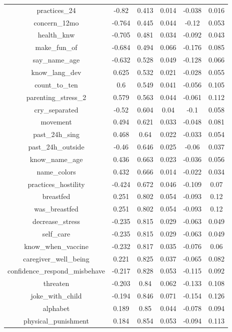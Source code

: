 \begin{table}[!htbp]
\begin{tabular}{@{\extracolsep{5pt}} cccccc}
practices\_24 & -0.82 & 0.413 & 0.014 & -0.038 & 0.016 \\ 
concern\_12mo & -0.764 & 0.445 & 0.044 & -0.12 & 0.053 \\ 
health\_knw & -0.705 & 0.481 & 0.034 & -0.092 & 0.043 \\ 
make\_fun\_of & -0.684 & 0.494 & 0.066 & -0.176 & 0.085 \\ 
say\_name\_age & -0.632 & 0.528 & 0.049 & -0.128 & 0.066 \\ 
know\_lang\_dev & 0.625 & 0.532 & 0.021 & -0.028 & 0.055 \\ 
count\_to\_ten & 0.6 & 0.549 & 0.041 & -0.056 & 0.105 \\ 
parenting\_stress\_2 & 0.579 & 0.563 & 0.044 & -0.061 & 0.112 \\ 
cry\_separated & -0.52 & 0.604 & 0.04 & -0.1 & 0.058 \\ 
movement & 0.494 & 0.621 & 0.033 & -0.048 & 0.081 \\ 
past\_24h\_sing & 0.468 & 0.64 & 0.022 & -0.033 & 0.054 \\ 
past\_24h\_outside & -0.46 & 0.646 & 0.025 & -0.06 & 0.037 \\ 
know\_name\_age & 0.436 & 0.663 & 0.023 & -0.036 & 0.056 \\ 
name\_colors & 0.432 & 0.666 & 0.014 & -0.022 & 0.034 \\ 
practices\_hostility & -0.424 & 0.672 & 0.046 & -0.109 & 0.07 \\ 
breastfed & 0.251 & 0.802 & 0.054 & -0.093 & 0.12 \\ 
was\_breastfed & 0.251 & 0.802 & 0.054 & -0.093 & 0.12 \\ 
decrease\_stress & -0.235 & 0.815 & 0.029 & -0.063 & 0.049 \\ 
self\_care & -0.235 & 0.815 & 0.029 & -0.063 & 0.049 \\ 
know\_when\_vaccine & -0.232 & 0.817 & 0.035 & -0.076 & 0.06 \\ 
caregiver\_well\_being & 0.221 & 0.825 & 0.037 & -0.065 & 0.082 \\ 
confidence\_respond\_misbehave & -0.217 & 0.828 & 0.053 & -0.115 & 0.092 \\ 
threaten & -0.203 & 0.84 & 0.062 & -0.133 & 0.108 \\ 
joke\_with\_child & -0.194 & 0.846 & 0.071 & -0.154 & 0.126 \\ 
alphabet & 0.189 & 0.85 & 0.044 & -0.078 & 0.094 \\ 
physical\_punishment & 0.184 & 0.854 & 0.053 & -0.094 & 0.113 \\ 

\end{tabular}
\end{table}
